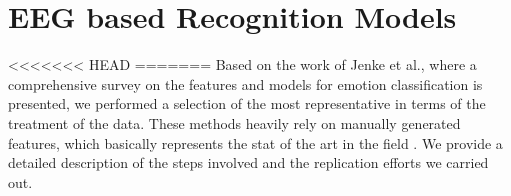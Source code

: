 \documentclass{sig-alternate}
\begin{document}


	

\section{EEG based Recognition Models}
\label{methods}
	
<<<<<<< HEAD
=======
Based on the work of Jenke et al.\cite{jenke2014feature}, where a 
comprehensive survey on  the features and models for emotion 
classification is presented, we performed a selection of the most 
representative in terms of the treatment of the data. These methods 
heavily rely on manually generated features, which basically represents 
the stat of the art in the field \cite{}. We provide a detailed description 
of the steps involved and the replication efforts we carried out. 
\end{document}
